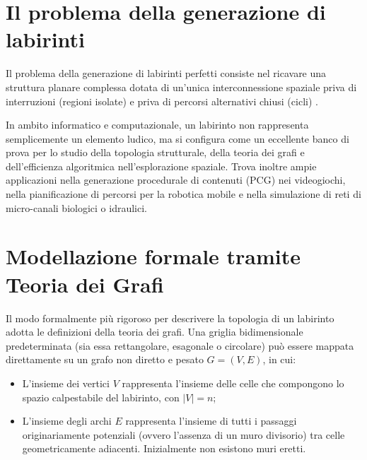 \documentclass[12pt, a4paper]{article}
\begin{document}
	\clearpage
	
	\tableofcontents
	\clearpage            
	
	
	\section{Il problema della generazione di labirinti}
	Il problema della generazione di labirinti perfetti consiste nel ricavare una struttura planare complessa dotata di un'unica interconnessione spaziale priva di interruzioni (regioni isolate) e priva di percorsi alternativi chiusi (cicli) \cite{wiki_maze}. 
	
	In ambito informatico e computazionale, un labirinto non rappresenta semplicemente un elemento ludico, ma si configura come un eccellente banco di prova per lo studio della topologia strutturale, della teoria dei grafi e dell'efficienza algoritmica nell'esplorazione spaziale. Trova inoltre ampie applicazioni nella generazione procedurale di contenuti (PCG) nei videogiochi, nella pianificazione di percorsi per la robotica mobile e nella simulazione di reti di micro-canali biologici o idraulici.
	
	\section{Modellazione formale tramite Teoria dei Grafi}
	Il modo formalmente più rigoroso per descrivere la topologia di un labirinto adotta le definizioni della teoria dei grafi. Una griglia bidimensionale predeterminata (sia essa rettangolare, esagonale o circolare) può essere mappata direttamente su un grafo non diretto e pesato $G = (V, E)$, in cui:
	\begin{itemize}
		\item L'insieme dei vertici $V$ rappresenta l'insieme delle celle che compongono lo spazio calpestabile del labirinto, con $|V| = n$;
		\item L'insieme degli archi $E$ rappresenta l'insieme di tutti i passaggi originariamente potenziali (ovvero l'assenza di un muro divisorio) tra celle geometricamente adiacenti. Inizialmente non esistono muri eretti.
	\end{itemize}
	
\end{document}
